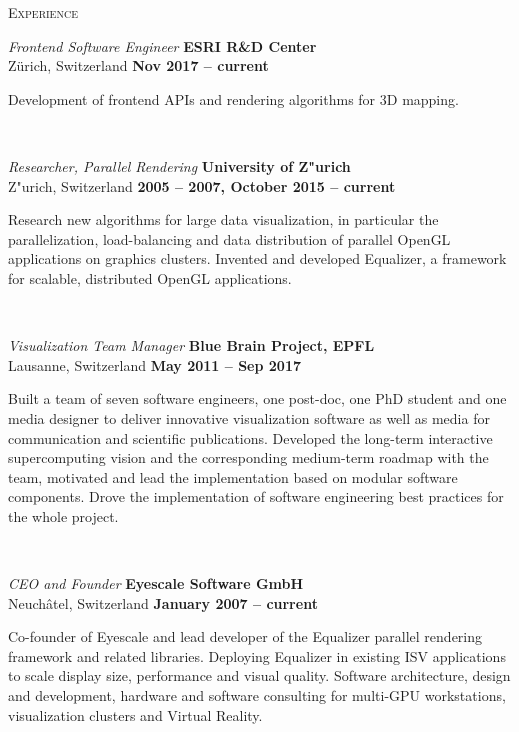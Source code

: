 \parbox[t]{2.5cm}{\scshape Experience}
\parbox[t]{12.5cm}{
  {\em Frontend Software Engineer} \hfill {\bf ESRI R\&D Center}\\
  Z{\"u}rich, Switzerland  \hfill {\bf Nov 2017 -- current}\exrule

  Development of frontend APIs and rendering algorithms for 3D mapping.}\\

\parbox[t]{2.5cm}{\hspace{1pt}}
\parbox[t]{12.5cm}{
  {\em Researcher, Parallel Rendering} \hfill {\bf University of Z"urich}\\
  Z"urich, Switzerland \hfill {\bf 2005 -- 2007, October 2015 -- current}\exrule

  Research new algorithms for large data visualization, in particular the
  parallelization, load-balancing and data distribution of parallel OpenGL
  applications on graphics clusters. Invented and developed Equalizer, a
  framework for scalable, distributed OpenGL applications.}\\

\parbox[t]{2.5cm}{\hspace{1pt}}
\parbox[t]{12.5cm}{
  {\em Visualization Team Manager} \hfill {\bf Blue Brain Project, EPFL}\\
  Lausanne, Switzerland  \hfill {\bf May 2011 -- Sep 2017}\exrule

  Built a team of seven software engineers, one post-doc, one PhD student and one
  media designer to deliver innovative visualization software as well as media
  for communication and scientific publications. Developed the long-term
  interactive supercomputing vision and the corresponding medium-term roadmap
  with the team, motivated and lead the implementation based on modular software
  components. Drove the implementation of software engineering best practices
  for the whole project.}\\

\parbox[t]{2.5cm}{\hspace{1pt}}
\parbox[t]{12.5cm}{
  {\em CEO and Founder} \hfill {\bf Eyescale Software GmbH}\\
  Neuch\^atel, Switzerland  \hfill {\bf January 2007 -- current}\exrule

  Co-founder of Eyescale and lead developer of the Equalizer parallel rendering
  framework and related libraries. Deploying Equalizer in existing ISV
  applications to scale display size, performance and visual quality. Software
  architecture, design and development, hardware and software consulting for
  multi-GPU workstations, visualization clusters and Virtual Reality.  }\\

